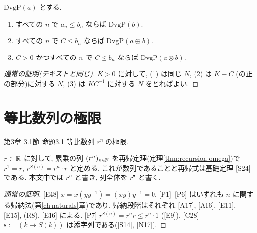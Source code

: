 \begin{thm}[テキスト定理2.18]
  $\mathrm{DvgP}(a)$ とする.
  \begin{enumerate}[label=(\arabic*)]
    \item すべての $n$ で $a_n \leq b_n$ ならば $\mathrm{DvgP}(b)$.
    \item すべての $n$ で $C \leq b_n$ ならば $\mathrm{DvgP}(a \oplus b)$.
    \item $C > 0$ かつすべての $n$ で $C \leq b_n$ ならば $\mathrm{DvgP}(a \otimes b)$.
  \end{enumerate}
\end{thm}
\begin{proof}[通常の証明(テキストと同じ)]
  $K > 0$ に対して, (1) は同じ $N$, (2) は $K - C$ (の正の部分)に対する $N$, (3) は $K C^{-1}$ に対する $N$ をとればよい.
\end{proof}

\section{等比数列の極限}

\begin{textref}{第3章 3.1節 命題3.1}
  等比数列 $r^n$ の極限.
\end{textref}

$r \in \mathbb{R}$ に対して, 累乗の列 $(r^n)_{n \in \mathbb{N}}$ を再帰定理(定理\ref{thm:recursion-omega})で $r^1 = r$, $r^{S(n)} = r^n \cdot r$ と定める. これが数列であることと再帰式は基礎定理 [S24] である. 本文中では $r^n$ と書き, 列全体を $r^{\bullet}$ と書く.

\begin{lem}\label{lem:pow}
\end{lem}
\begin{proof}[通常の証明]
  [E48] $x = x(yy^{-1}) = (xy)y^{-1} = 0$. [P1]--[P6] はいずれも $n$ に関する帰納法(第\ref{ch:naturals}章)であり, 帰納段階はそれぞれ [A17], [A16], [E11], [E15], (R8), [E16] による. [P7] $r^{S(n)} = r^n r \leq r^n \cdot 1$ ([E9]). [C28] $\mathsf{s} := (k \mapsto S(k))$ は添字列である([S14], [N17]).
\end{proof}

